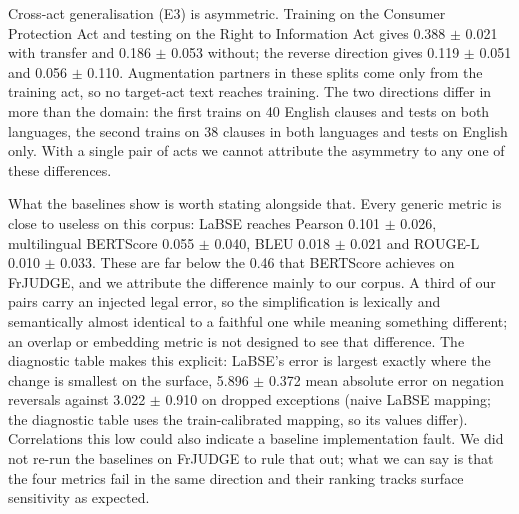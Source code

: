 \documentclass[conference]{IEEEtran}
\begin{document}
Cross-act generalisation (E3) is asymmetric. Training on the Consumer Protection Act and testing on the Right to Information Act gives 0.388 \ensuremath{\pm} 0.021 with transfer and 0.186 \ensuremath{\pm} 0.053 without; the reverse direction gives 0.119 \ensuremath{\pm} 0.051 and 0.056 \ensuremath{\pm} 0.110. Augmentation partners in these splits come only from the training act, so no target-act text reaches training. The two directions differ in more than the domain: the first trains on 40 English clauses and tests on both languages, the second trains on 38 clauses in both languages and tests on English only. With a single pair of acts we cannot attribute the asymmetry to any one of these differences.

What the baselines show is worth stating alongside that. Every generic metric is close to useless on this corpus: LaBSE reaches Pearson 0.101 \ensuremath{\pm} 0.026, multilingual BERTScore 0.055 \ensuremath{\pm} 0.040, BLEU 0.018 \ensuremath{\pm} 0.021 and ROUGE-L 0.010 \ensuremath{\pm} 0.033. These are far below the 0.46 that BERTScore achieves on FrJUDGE, and we attribute the difference mainly to our corpus. A third of our pairs carry an injected legal error, so the simplification is lexically and semantically almost identical to a faithful one while meaning something different; an overlap or embedding metric is not designed to see that difference. The diagnostic table makes this explicit: LaBSE's error is largest exactly where the change is smallest on the surface, 5.896 \ensuremath{\pm} 0.372 mean absolute error on negation reversals against 3.022 \ensuremath{\pm} 0.910 on dropped exceptions (naive LaBSE mapping; the diagnostic table uses the train-calibrated mapping, so its values differ). Correlations this low could also indicate a baseline implementation fault. We did not re-run the baselines on FrJUDGE to rule that out; what we can say is that the four metrics fail in the same direction and their ranking tracks surface sensitivity as expected.
\end{document}
